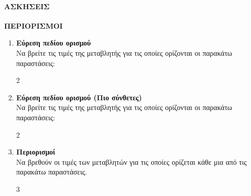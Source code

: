 \documentclass[11pt,a4paper,modern]{FFExercises}
\begin{document}
\paragraph{ΑΣΚΗΣΕΙΣ}

\begin{center}
\textbf{ΠΕΡΙΟΡΙΣΜΟΙ}
\end{center}

\begin{enumerate}[resume]
\item \textbf{Εύρεση πεδίου ορισμού}\\
Να βρείτε τις τιμές της μεταβλητής για τις οποίες ορίζονται οι παρακάτω παραστάσεις:
\begin{multicols}{2}
\end{multicols}

\item \textbf{Εύρεση πεδίου ορισμού (Πιο σύνθετες)}\\
Να βρείτε τις τιμές της μεταβλητής για τις οποίες ορίζονται οι παρακάτω παραστάσεις:
\begin{multicols}{2}
\end{multicols}

\item \textbf{Περιορισμοί}\\
Να βρεθούν οι τιμές των μεταβλητών για τις οποίες ορίζεται κάθε μια από τις παρακάτω παραστάσεις.
\begin{multicols}{3}
\end{multicols}


\end{enumerate}
\end{document}
